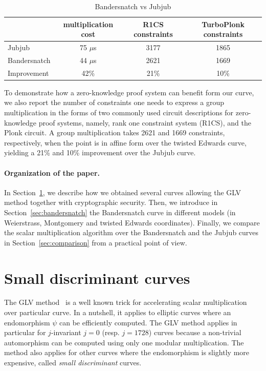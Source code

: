 \documentclass[smallextended]{svjour3}
\begin{document}
\begin{table}[ht] %
  \centering
  
  \begin{tabular}{|l|c|c|c|}\hline
      & multiplication cost & R1CS constraints & TurboPlonk constraints  \\\hline\hline
    Jubjub & 75 $\mu$s  & 3177 &  1865\\\hline
    Bandersnatch & 44 $\mu$s  & 2621 & 1669\\\hline\hline   
    Improvement & 42\% & 21\% & 10\%\\\hline
  \end{tabular}
  \caption{Bandersnatch vs Jubjub}
  \label{tab:comp}
\end{table}

To demonstrate how a zero-knowledge proof system can benefit
form our curve, we also report the number of 
constraints one needs to express a group multiplication
in the forms of 
two commonly used circuit descriptions for zero-knowledge 
proof systems, namely,
rank one constraint system (R1CS), 
and the Plonk circuit.
A group multiplication takes 
2621 and 1669
constraints, respectively, when the point is in affine form over the 
twisted Edwards curve,
yielding a 21\% and 10\% improvement over the Jubjub curve.

\paragraph{Organization of the paper.}
In Section~\ref{sec:small-disc-curves}, we describe how we obtained
several curves allowing the GLV method together with cryptographic
security.
Then, we introduce in Section~\ref{sec:bandersnatch} the Bandersnatch
curve in different models (in Weierstrass, Montgomery and twisted Edwards
coordinates).
Finally, we compare the scalar multiplication algorithm over
the Bandersnatch and the Jubjub curves in
Section~\ref{sec:comparison} from a practical point of view.


\section{Small discriminant curves}\label{sec:small-disc-curves}

The GLV method~\cite{C:GalLamVan01} is a well known trick for accelerating
scalar multiplication over particular curve. In a nutshell, it applies
to elliptic curves where an endomorphism $\psi$ can be efficiently computed.
The GLV method applies in particular for $j$-invariant $j=0$
(resp. $j=1728$) curves because a non-trivial automorphism can be
computed using only one modular multiplication. %
The method also applies for other curves where the endomorphism is
slightly more expensive, called \emph{small discriminant} curves.
\end{document}
